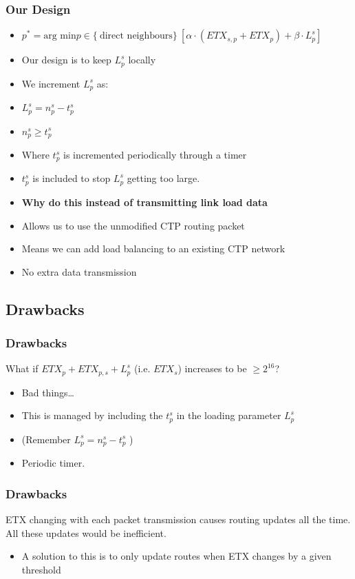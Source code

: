 \documentclass{beamer}
\begin{document}
\begin{frame}
  \frametitle{Our Design}
  \begin{itemize}
    \item $p^* = \text{arg min}  p \in \{\ \text{direct neighbours} \}\
      [\alpha  \cdot (ETX_{s,p} + ETX_p) + \beta \cdot L_p^s]$

    \item Our design is to keep $L_p^s$ locally 
    \item We increment $L_p^s$ as:
    \item $L_p^s = n_p^s - t_p^s$
    \item $n_p^s \geq t_p^s$
    \item Where $t_p^s$ is incremented periodically through a timer
    \item $t_p^s$ is included to stop $L_p^s$ getting too large.
    \item \textbf{Why do this instead of transmitting link load data}
    \item Allows us to use the unmodified CTP routing packet
    \item Means we can add load balancing to an existing CTP network
    \item No extra data transmission
  \end{itemize}

\end{frame}

\subsection{Drawbacks}

\begin{frame}
  \frametitle{Drawbacks}
    What if $ETX_p + ETX_{p,s} + L_p^s$ (i.e. $ETX_s$) increases to be $\geq 2^{16}$?
  \begin{itemize}
    \item Bad things\ldots
    \item This is managed by including the $t_p^s$ in the loading parameter
    $L_p^s$
    \item (Remember $L_p^s = n_p^s - t_p^s$ )
    \item Periodic timer.
  \end{itemize}
\end{frame}  



\begin{frame}
  \frametitle{Drawbacks}
    ETX changing with each packet transmission causes routing updates all the
    time. All these updates would be inefficient.
  \begin{itemize}
    \item A solution to this is to only update routes when ETX changes by a given
    threshold
    \end{itemize}
\end{frame}  
\end{document}
